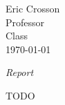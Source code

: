\documentclass[12pt]{article}
\begin{document}
\begin{flushleft}
Eric Crosson \\
Professor \\
Class \\
\today \\

\begin{center}
\emph{Report}
\end{center}

\setlength{\parindent}{0.5in}

TODO

\end{flushleft}
\end{document}
